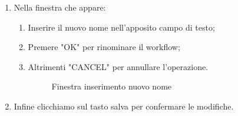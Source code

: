 \begin{enumerate}
	\newpage
	\item Nella finestra che appare:
	\begin{enumerate}
		\item Inserire il nuovo nome nell'apposito campo di testo;
		\item Premere "OK" per rinominare il workflow;
		\item Altrimenti "CANCEL" per annullare l'operazione.
		\begin{figure}[!ht]
			\centering
			\caption{Finestra inserimento nuovo nome}
		\end{figure}
	\end{enumerate}
	\newpage
	\item Infine clicchiamo sul tasto salva per confermare le modifiche.

\end{enumerate}
